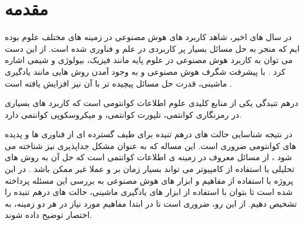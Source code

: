 \section{مقدمه}


در سال های اخیر، شاهد کاربرد های هوش مصنوعی در زمینه های مختلف علوم بوده ایم که منجر به حل مسائل بسیار پر کاربردی در علم و فناوری شده است. از این دست می توان به کاربرد هوش مصنوعی در علوم پایه مانند فیزیک، بیولوژی و شیمی اشاره کرد
\cite{Taddeo2018}.
با پیشرفت شگرف هوش مصنوعی و به وجود آمدن روش هایی مانند یادگیری ماشینی، قدرت حل مسائل پیچیده تر با آن نیز افزایش یافته است
\cite{chen2019}.

درهم تنیدگی یکی از منابع کلیدی علوم اطلاعات کوانتومی است که کاربرد های بسیاری در رمزنگاری کوانتمی، تلپورت کوانتمی، و میکروسکوپی کوانتمی دارد.

در نتیجه شناسایی حالت های درهم تنیده برای طیف گسترده ای از فناوری ها و پدیده های کوانتومی ضروری است. این مساله که به عنوان مشکل جداپذیری نیز شناخته می شود
\cite{horodecki_1996}،
از مسائل معروف در زمینه ی اطلاعات کوانتمی است که حل آن به روش های تحلیلی با استفاده از کامپیوتر می تواند بسیار زمان بر و عملا غیر ممکن باشد
\cite{gharibia_2010}.
در این پروژه با استفاده از مفاهیم و ابزار های هوش مصنوعی به بررسی این مسئله پرداخته شده است تا بتوان با استفاده از ابزار های یادگیری ماشینی، حالت های درهم تنیده را تشخیص دهیم.
 از این رو، ضروری است تا در ابتدا مفاهیم مورد نیاز در هر دو زمینه، به اختصار توضیح داده شوند.
